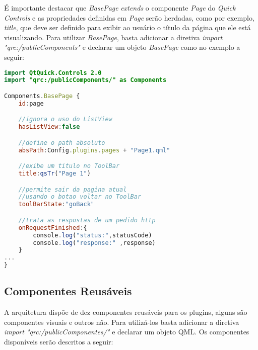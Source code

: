 É importante destacar que \textit{BasePage} \textit{extends} o componente \textit{Page} do \textit{Quick Controls} e as propriedades definidas em \textit{Page} serão herdadas, como por exemplo, \textit{title}, que deve ser definido para exibir ao usuário o título da página que ele está visualizando. Para utilizar \textit{BasePage}, basta adicionar a diretiva \textit{import "qrc:/publicComponents"} e declarar um objeto \textit{BasePage} como no exemplo a seguir:

\begin{center}
\begin{lstlisting}[language=qml]
import QtQuick.Controls 2.0
import "qrc:/publicComponents/" as Components

Components.BasePage {
	id:page

	//ignora o uso do ListView
	hasListView:false

	//define o path absoluto
	absPath:Config.plugins.pages + "Page1.qml"

	//exibe um titulo no ToolBar
	title:qsTr("Page 1")

	//permite sair da pagina atual
	//usando o botao voltar no ToolBar
	toolBarState:"goBack"

	//trata as respostas de um pedido http
	onRequestFinished:{
		console.log("status:",statusCode)
		console.log("response:" ,response)
	}
...
}
\end{lstlisting}
\end{center}


\subsection{Componentes Reusáveis}\label{sec:solucao-desenvolvida}
A arquitetura dispõe de dez componentes reusáveis para os plugins, alguns são componentes visuais e outros não. Para utilizá-los basta adicionar a diretiva \textit{import "qrc:/publicComponentes/"} e declarar um objeto QML. Os componentes disponíveis serão descritos a seguir:

